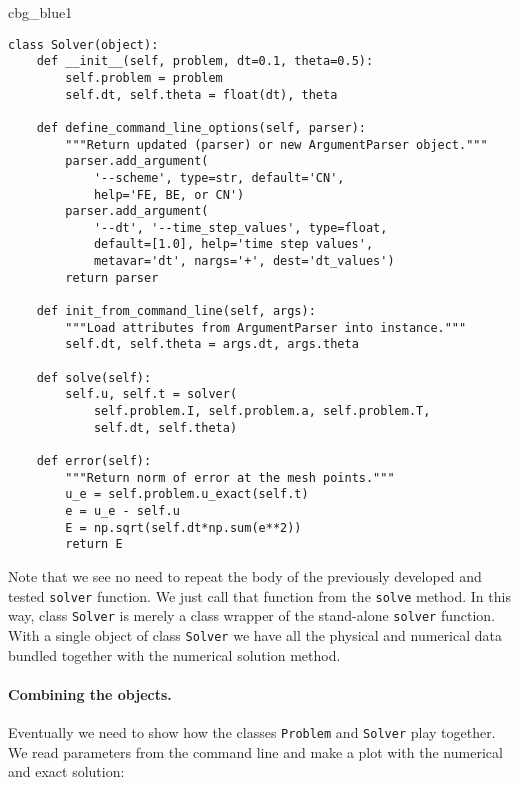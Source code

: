 \documentclass[graybox,sectrefs,envcountresetchap,open=right,final]{svmonodo}
\newenvironment{_cod_tight}[1]{
   \def\FrameCommand{\colorbox{#1}}
   \FrameRule0.6pt\MakeFramed {\FrameRestore}\vskip3mm}
   {\vskip0mm\endMakeFramed}
\newenvironment{cod}[1]{
\bgroup\rmfamily
\fboxsep=0mm\relax
\begin{_cod_tight}{#1}
\list{}{\parsep=-2mm\parskip=0mm\topsep=0pt\leftmargin=2mm
\rightmargin=2\leftmargin\leftmargin=4pt\relax}
\item\relax}
{\endlist\end{_cod_tight}\egroup}
\begin{document}
\begin{cod}{cbg_blue1}\begin{Verbatim}[numbers=none,fontsize=\fontsize{9pt}{9pt},baselinestretch=0.95,xleftmargin=2mm]
class Solver(object):
    def __init__(self, problem, dt=0.1, theta=0.5):
        self.problem = problem
        self.dt, self.theta = float(dt), theta

    def define_command_line_options(self, parser):
        """Return updated (parser) or new ArgumentParser object."""
        parser.add_argument(
            '--scheme', type=str, default='CN',
            help='FE, BE, or CN')
        parser.add_argument(
            '--dt', '--time_step_values', type=float,
            default=[1.0], help='time step values',
            metavar='dt', nargs='+', dest='dt_values')
        return parser

    def init_from_command_line(self, args):
        """Load attributes from ArgumentParser into instance."""
        self.dt, self.theta = args.dt, args.theta

    def solve(self):
        self.u, self.t = solver(
            self.problem.I, self.problem.a, self.problem.T,
            self.dt, self.theta)

    def error(self):
        """Return norm of error at the mesh points."""
        u_e = self.problem.u_exact(self.t)
        e = u_e - self.u
        E = np.sqrt(self.dt*np.sum(e**2))
        return E
\end{Verbatim}
\end{cod}
\noindent
Note that we see no need to repeat the body of the previously
developed and tested \texttt{solver} function. We just call that function from
the \texttt{solve} method.  In this way, class \texttt{Solver} is merely a class wrapper
of the stand-alone \texttt{solver} function. With a single object of class \texttt{Solver}
we have all the physical and numerical data bundled together with the numerical
solution method.


\paragraph{Combining the objects.}
Eventually we need to show how the classes \texttt{Problem} and \texttt{Solver}
play together. We read parameters from the command line and make a
plot with the numerical and exact solution:
\end{document}
